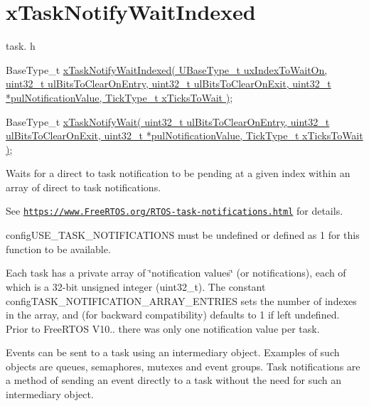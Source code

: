 \hypertarget{group__x_task_notify_wait_indexed}{}\section{x\+Task\+Notify\+Wait\+Indexed}
\label{group__x_task_notify_wait_indexed}
task. h 
\begin{DoxyPre}
BaseType\_t \hyperlink{externals_2freertos_2include_2task_8h_a5bcd5a5b7d7c41dd782a38093be1b7c9}{xTaskNotifyWaitIndexed( UBaseType\_t uxIndexToWaitOn, uint32\_t ulBitsToClearOnEntry, uint32\_t ulBitsToClearOnExit, uint32\_t *pulNotificationValue, TickType\_t xTicksToWait )};\end{DoxyPre}



\begin{DoxyPre}BaseType\_t \hyperlink{externals_2freertos_2include_2task_8h_a212928744c3d5e0ccc56f1324a3c26f3}{xTaskNotifyWait( uint32\_t ulBitsToClearOnEntry, uint32\_t ulBitsToClearOnExit, uint32\_t *pulNotificationValue, TickType\_t xTicksToWait )};
\end{DoxyPre}


Waits for a direct to task notification to be pending at a given index within an array of direct to task notifications.

See \href{https://www.FreeRTOS.org/RTOS-task-notifications.html}{\tt https\+://www.\+Free\+R\+T\+O\+S.\+org/\+R\+T\+O\+S-\/task-\/notifications.\+html} for details.

config\+U\+S\+E\+\_\+\+T\+A\+S\+K\+\_\+\+N\+O\+T\+I\+F\+I\+C\+A\+T\+I\+O\+NS must be undefined or defined as 1 for this function to be available.

Each task has a private array of \char`\"{}notification values\char`\"{} (or \textquotesingle{}notifications\textquotesingle{}), each of which is a 32-\/bit unsigned integer (uint32\+\_\+t). The constant config\+T\+A\+S\+K\+\_\+\+N\+O\+T\+I\+F\+I\+C\+A\+T\+I\+O\+N\+\_\+\+A\+R\+R\+A\+Y\+\_\+\+E\+N\+T\+R\+I\+ES sets the number of indexes in the array, and (for backward compatibility) defaults to 1 if left undefined. Prior to Free\+R\+T\+OS V10.. there was only one notification value per task.

Events can be sent to a task using an intermediary object. Examples of such objects are queues, semaphores, mutexes and event groups. Task notifications are a method of sending an event directly to a task without the need for such an intermediary object.

